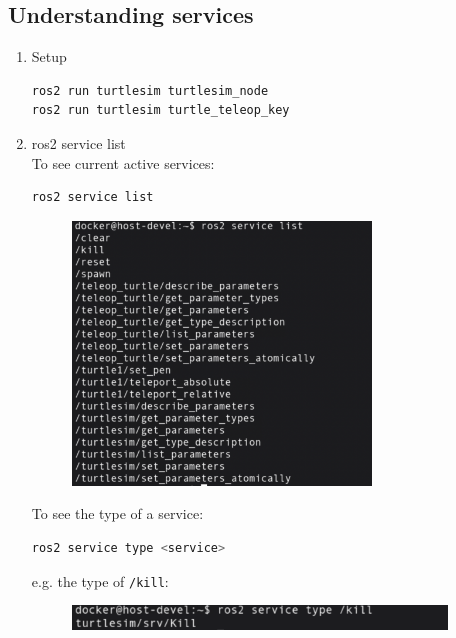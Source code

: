 \documentclass[12pt, a4paper]{article}
\begin{document}
\newpage
\subsection{Understanding services}
\begin{enumerate}
	\item Setup
\begin{lstlisting}[language=bash]
ros2 run turtlesim turtlesim_node
ros2 run turtlesim turtle_teleop_key
\end{lstlisting}
\item ros2 service list\\
To see current active services:
\begin{lstlisting}[language=bash]
ros2 service list
\end{lstlisting}
\begin{figure}[h]
	\centering
	\includegraphics[width=0.75\textwidth]{p1.5-1}
\end{figure}
To see the type of a service:
\begin{lstlisting}[language=bash]
ros2 service type <service>
\end{lstlisting}
e.g. the type of \texttt{/kill}:
\begin{figure}[h]
	\setlength{\leftskip}{2.4em}
	\includegraphics[width=0.94\textwidth]{p1.5-2}
\end{figure}


\end{enumerate}
\end{document}
